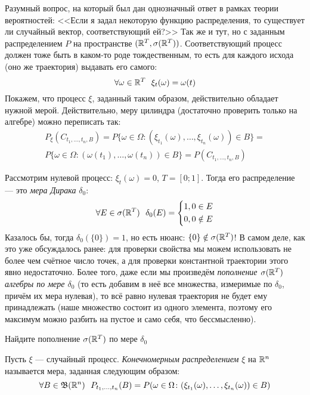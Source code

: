 \begin{note}
	Разумный вопрос, на который был дан однозначный ответ в рамках теории вероятностей: <<Если я задал некоторую функцию распределения, то существует ли случайный вектор, соответствующий ей?>> Так же и тут, но с заданным распределением $P$ на пространстве $(\mathbb{R}^T, \sigma(\mathbb{R}^T))$. Соответствующий процесс должен тоже быть в каком-то роде тождественным, то есть для каждого исхода (оно же траектория) выдавать его самого:
	\[
	\forall \omega \in \mathbb{R}^T\ \ \xi_t(\omega) = \omega(t)
	\]
	Покажем, что процесс $\xi$, заданный таким образом, действительно обладает нужной мерой. Действительно, меру цилиндра (достаточно проверить только на алгебре) можно переписать так:
	\begin{multline*}
		P_\xi(C_{t_1, \ldots, t_n, B}) = P\{\omega \in \Omega \colon (\xi_{t_1}(\omega), \ldots, \xi_{t_n}(\omega)) \in B\} =
		\\
		P\{\omega \in \Omega \colon (\omega(t_1), \ldots, \omega(t_n)) \in B\} = P(C_{t_1, \ldots, t_n, B})
	\end{multline*}
\end{note}

\begin{example}
	Рассмотрим нулевой процесс: $\xi_t(\omega) = 0$, $T = [0; 1]$. Тогда его распределение --- это \textit{мера Дирака} $\delta_0$:
	\[
	\forall E \in \sigma(\mathbb{R}^T)\ \ \delta_0(E) = \left\{\begin{aligned}
		&{1, 0 \in E}
		\\
		&{0, 0 \notin E}
	\end{aligned}\right.
	\]
	Казалось бы, тогда $\delta_0(\{0\}) = 1$, но есть нюанс: $\{0\} \notin \sigma(\mathbb{R}^T)$! В самом деле, как это уже обсуждалось ранее: для проверки свойства мы можем использовать не более чем счётное число точек, а для проверки константной траектории этого явно недостаточно. Более того, даже если мы произведём \textit{пополнение $\sigma(\mathbb{R}^T)$ алгебры по мере $\delta_0$} (то есть добавим в неё все множества, измеримые по $\delta_0$, причём их мера нулевая), то всё равно нулевая траектория не будет ему принадлежать (наше множество состоит из одного элемента, поэтому его максимум можно разбить на пустое и само себя, что бессмысленно).
\end{example}

\begin{exercise}
	Найдите пополнение $\sigma(\mathbb{R}^T)$ по мере $\delta_0$
\end{exercise}

\begin{definition}
	Пусть $\xi$ --- случайный процесс. \textit{Конечномерным распределением} $\xi$ на $\mathbb{R}^n$ называется мера, заданная следующим образом:
	\[
	\forall B \in \B(\R^n)\ \ P_{t_1, \ldots, t_n}(B) = P(\omega \in \Omega \colon (\xi_{t_1}(\omega), \ldots, \xi_{t_n}(\omega)) \in B)
	\]
\end{definition}

